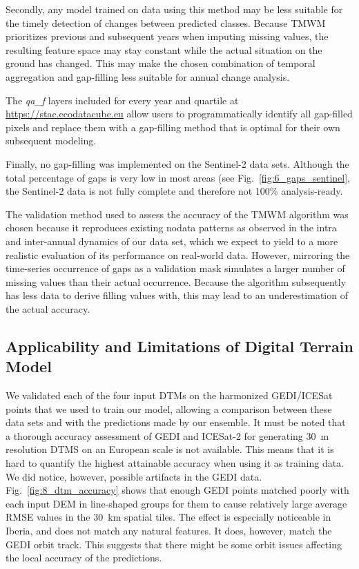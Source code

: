 Secondly, any model trained on data using this method may be less suitable for the timely detection of changes between predicted classes. Because TMWM prioritizes previous and subsequent years when imputing missing values, the resulting feature space may stay constant while the actual situation on the ground has changed. This may make the chosen combination of temporal aggregation and gap-filling less suitable for annual change analysis. 

The \emph{qa\_f} layers included for every year and quartile at \url{https://stac.ecodatacube.eu} allow users to programmatically identify all gap-filled pixels and replace them with a gap-filling method that is optimal for their own subsequent modeling.

Finally, no gap-filling was implemented on the Sentinel-2 data sets. Although the total percentage of gaps is very low in most areas (see Fig.\@~\ref{fig:6_gaps_sentinel}, the Sentinel-2 data is not fully complete and therefore not 100\% analysis-ready.

The validation method used to assess the accuracy of the TMWM algorithm was chosen because it reproduces existing nodata patterns as observed in the intra and inter-annual dynamics of our data set, which we expect to yield to a more realistic evaluation of its performance on real-world data. However, mirroring the time-series occurrence of gaps as a validation mask simulates a larger number of missing values than their actual occurrence. Because the algorithm subsequently has less data to derive filling values with, this may lead to an underestimation of the actual accuracy.
    
\subsection*{Applicability and Limitations of Digital Terrain Model}

We validated each of the four input DTMs on the harmonized GEDI/ICESat points that we used to train our model, allowing a comparison between these data sets and with the predictions made by our ensemble. It must be noted that a thorough accuracy assessment of GEDI and ICESat-2 for generating 30~m resolution DTMS on an European scale is not available. This means that it is hard to quantify the highest attainable accuracy when using it as training data. We did notice, however, possible artifacts in the GEDI data. Fig.\@~\ref{fig:8_dtm_accuracy} shows that enough GEDI points matched poorly with each input DEM in line-shaped groups for them to cause relatively large average RMSE values in the 30~km spatial tiles. The effect is especially noticeable in Iberia, and does not match any natural features. It does, however, match the GEDI orbit track. This suggests that there might be some orbit issues affecting the local accuracy of the predictions. 

